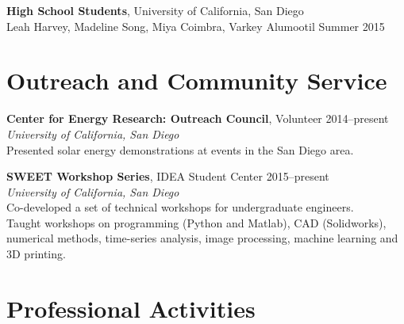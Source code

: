 \documentclass[]{res}
\begin{document}
\begin{resume}
\textbf{High School Students}, University of California, San Diego \\
Leah Harvey, Madeline Song, Miya Coimbra, Varkey Alumootil \hfill Summer 2015


\section{Outreach and Community Service}
\vspace{0.1in}
%

\textbf{Center for Energy Research: Outreach Council}, Volunteer \hfill 2014--present \\
\textit{University of California, San Diego} \\
Presented solar energy demonstrations at events in the San Diego area.


\textbf{SWEET Workshop Series}, IDEA Student Center \hfill 2015--present \\
\textit{University of California, San Diego} \\
Co-developed a set of technical workshops for undergraduate engineers. \\
Taught workshops on programming (Python and Matlab), CAD (Solidworks),
numerical methods, time-series analysis, image processing, machine learning and
3D printing.


\section{Professional Activities}
\vspace{0.1in}


\end{resume}
\end{document}
